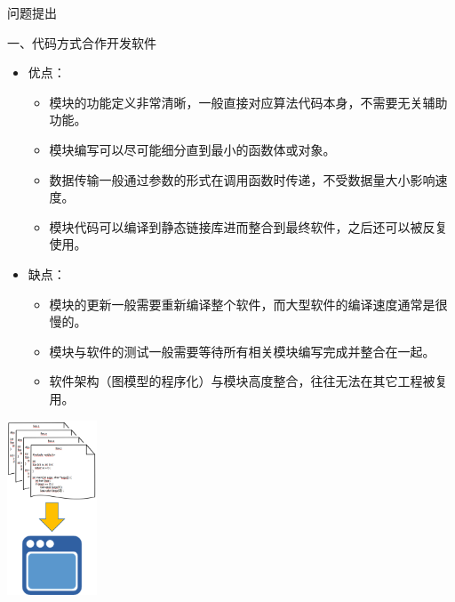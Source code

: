 \documentclass[9pt]{beamer}
\begin{document}
	\begin{frame}{问题提出}
		\begin{block}{一、代码方式合作开发软件}
			\begin{itemize}
				\item<2-> 优点：
				\begin{itemize}
					\item 模块的功能定义非常清晰，一般直接对应算法代码本身，不需要无关辅助功能。
					\item 模块编写可以尽可能细分直到最小的函数体或对象。
					\item 数据传输一般通过参数的形式在调用函数时传递，不受数据量大小影响速度。
					\item 模块代码可以编译到静态链接库进而整合到最终软件，之后还可以被反复使用。
				\end{itemize}
				\item<3-> 缺点：
				\begin{itemize}
					\item 模块的更新一般需要重新编译整个软件，而大型软件的编译速度通常是很慢的。
					\item 模块与软件的测试一般需要等待所有相关模块编写完成并整合在一起。
					\item 软件架构（图模型的程序化）与模块高度整合，往往无法在其它工程被复用。
				\end{itemize}
			\end{itemize}
		\end{block}
		\begin{center}
			\includegraphics[width=0.2\textwidth,angle=90]{./img/way1}
		\end{center}
	\end{frame}
\end{document}
